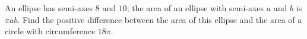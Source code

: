 An ellipse has semi-axes $8$ and $10$; the area of an ellipse with semi-axes $a$ and $b$ is $\pi ab$. Find the positive difference between the area of this ellipse and the area of a circle with circumference $18\pi$.
